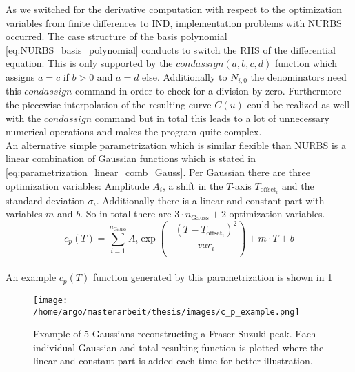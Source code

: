 \documentclass{scrartcl}[12pt, halfparskip]
\numberwithin{equation}{section}
\numberwithin{figure}{section}
\numberwithin{table}{section}
\begin{document}
As we switched for the derivative computation with respect to the optimization variables from finite differences to IND, implementation problems with NURBS occurred. 
The case structure of the basis polynomial \cref{eq:NURBS_basis_polynomial} conducts to switch the RHS of the differential equation. This is only supported by the $condassign(a,b,c,d)$ function which assigns $a=c$ if $b>0$ and $a=d$ else. Additionally to $N_{i,0}$ the denominators need this $condassign$ command in order to check for a division by zero. 
Furthermore the piecewise interpolation of the resulting curve $C(u)$ could be realized as well with the $condassign$ command but in total this leads to a lot of unnecessary numerical operations and makes the program quite complex. \\
An alternative simple parametrization which is similar flexible than NURBS is a linear combination of Gaussian functions which is stated in \cref{eq:parametrization_linear_comb_Gauss}. Per Gaussian there are three optimization variables: Amplitude $A_i$, a shift in the $T$-axis $T_{\text{offset}_i}$ and the standard deviation $\sigma_i$. Additionally there is a linear and constant part with variables $m$ and $b$. So in total there are $3 \cdot n_{\text{Gauss}} + 2$ optimization variables. \\


\begin{equation}
	c_p(T) = \sum_{i=1}^{n_{\text{Gauss}}} A_i \exp\left(- \frac{(T - T_{\text{offset}_i})^2}{var_i}\right) + m \cdot T + b
	\label{eq:parametrization_linear_comb_Gauss}
\end{equation} \\

An example $c_p(T)$ function generated by this parametrization is shown in \cref{fig:parametrization_example_linear_comb_gauss}


\begin{figure}[H]
	\centering
	\texttt{[image: /home/argo/masterarbeit/thesis/images/c\_p\_example.png]}
	\caption{Example of 5 Gaussians reconstructing a Fraser-Suzuki peak. Each individual Gaussian and total resulting function is plotted where the linear and constant part is added each time for better illustration.}
	\label{fig:parametrization_example_linear_comb_gauss}
\end{figure}
\end{document}
